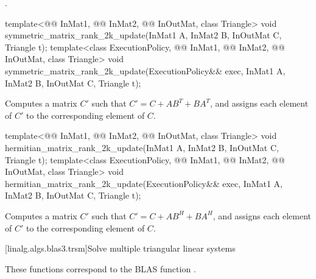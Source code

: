 \pnum
\complexity
{}.

\begin{itemdecl}
template<@@ InMat1, @@ InMat2,
         @@ InOutMat, class Triangle>
  void symmetric_matrix_rank_2k_update(InMat1 A, InMat2 B, InOutMat C, Triangle t);
template<class ExecutionPolicy, @@ InMat1, @@ InMat2,
         @@ InOutMat, class Triangle>
  void symmetric_matrix_rank_2k_update(ExecutionPolicy&& exec,
                                       InMat1 A, InMat2 B, InOutMat C, Triangle t);
\end{itemdecl}

\begin{itemdescr}
\pnum
\effects
Computes a matrix $C'$ such that $C' = C + A B^T + B A^T$,
and assigns each element of $C'$ to the corresponding element of $C$.
\end{itemdescr}

\begin{itemdecl}
template<@@ InMat1, @@ InMat2,
         @@ InOutMat, class Triangle>
  void hermitian_matrix_rank_2k_update(InMat1 A, InMat2 B, InOutMat C, Triangle t);
template<class ExecutionPolicy,
         @@ InMat1, @@ InMat2,
         @@ InOutMat, class Triangle>
  void hermitian_matrix_rank_2k_update(ExecutionPolicy&& exec,
                                       InMat1 A, InMat2 B, InOutMat C, Triangle t);
\end{itemdecl}

\begin{itemdescr}
\pnum
\effects
Computes a matrix $C'$ such that $C' = C + A B^H + B A^H$,
and assigns each element of $C'$ to the corresponding element of $C$.
\end{itemdescr}

[linalg.algs.blas3.trsm]{Solve multiple triangular linear systems}

\pnum
\begin{note}
These functions correspond to the BLAS function \supercite{blas3}.
\end{note}

